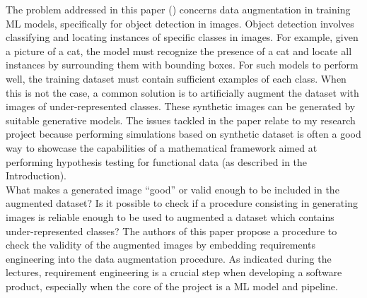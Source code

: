 The problem addressed in this paper (\cite{Vonderhaar}) concerns data augmentation in training ML models, specifically for object detection in images. Object detection involves classifying and locating instances of specific classes in images. For example, given a picture of a cat, the model must recognize the presence of a cat and locate all instances by surrounding them with bounding boxes. For such models to perform well, the training dataset must contain sufficient examples of each class. When this is not the case, a common solution is to artificially augment the dataset with images of under-represented classes. These synthetic images can be generated by suitable generative models. The issues tackled in the paper relate to my research project because performing simulations based on synthetic dataset is often a good way to showcase the capabilities of a mathematical framework aimed at performing hypothesis testing for functional data (as described in the Introduction).\\
What makes a generated image “good” or valid enough to be included in the augmented dataset? Is it possible to check if a procedure consisting in generating images is reliable enough to be used to augmented a dataset which contains under-represented classes? The authors of this paper propose a procedure to check the validity of the augmented images by embedding requirements engineering into the data augmentation procedure. As indicated during the lectures, requirement engineering is a crucial step when developing a software product, especially when the core of the project is a ML model and pipeline. \\
